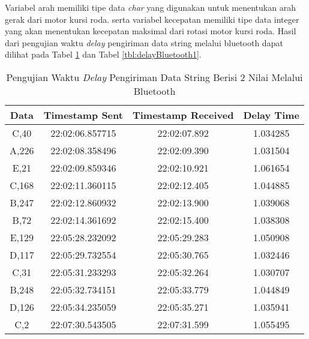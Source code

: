 Variabel arah memiliki tipe data \emph{char} yang digunakan untuk menentukan arah gerak dari motor kursi roda. serta variabel kecepatan memiliki tipe data integer yang akan menentukan kecepatan maksimal dari rotasi motor kursi roda. Hasil dari pengujian waktu \emph{delay} pengiriman data string melalui bluetooth dapat dilihat pada Tabel \ref{tbl:delayBluetooth} dan Tabel \ref{tbl:delayBluetooth1}.
\begin{longtable}{|ccc|c|}
  \caption{Pengujian Waktu \emph{Delay} Pengiriman Data String Berisi 2 Nilai Melalui Bluetooth}
  \label{tbl:delayBluetooth}\\
    \hline
    \multicolumn{1}{|c|}{Data}  & \multicolumn{1}{c|}{Timestamp Sent}  & Timestamp Received & Delay Time  \\ \hline
    \endfirsthead
    \endhead
    \multicolumn{1}{|c|}{C,40}  & \multicolumn{1}{c|}{22:02:06.857715} & 22:02:07.892       & 1.034285    \\ \hline
    \multicolumn{1}{|c|}{A,226} & \multicolumn{1}{c|}{22:02:08.358496} & 22:02:09.390       & 1.031504    \\ \hline
    \multicolumn{1}{|c|}{E,21}  & \multicolumn{1}{c|}{22:02:09.859346} & 22:02:10.921       & 1.061654    \\ \hline
    \multicolumn{1}{|c|}{C,168} & \multicolumn{1}{c|}{22:02:11.360115} & 22:02:12.405       & 1.044885    \\ \hline
    \multicolumn{1}{|c|}{B,247} & \multicolumn{1}{c|}{22:02:12.860932} & 22:02:13.900       & 1.039068    \\ \hline
    \multicolumn{1}{|c|}{B,72}  & \multicolumn{1}{c|}{22:02:14.361692} & 22:02:15.400       & 1.038308    \\ \hline
    \multicolumn{1}{|c|}{E,129} & \multicolumn{1}{c|}{22:05:28.232092} & 22:05:29.283       & 1.050908    \\ \hline
    \multicolumn{1}{|c|}{D,117} & \multicolumn{1}{c|}{22:05:29.732554} & 22:05:30.765       & 1.032446    \\ \hline
    \multicolumn{1}{|c|}{C,31}  & \multicolumn{1}{c|}{22:05:31.233293} & 22:05:32.264       & 1.030707    \\ \hline
    \multicolumn{1}{|c|}{B,248} & \multicolumn{1}{c|}{22:05:32.734151} & 22:05:33.779       & 1.044849    \\ \hline
    \multicolumn{1}{|c|}{D,126} & \multicolumn{1}{c|}{22:05:34.235059} & 22:05:35.271       & 1.035941    \\ \hline
    \multicolumn{1}{|c|}{C,2}   & \multicolumn{1}{c|}{22:07:30.543505} & 22:07:31.599       & 1.055495    \\ \hline

\end{longtable}
